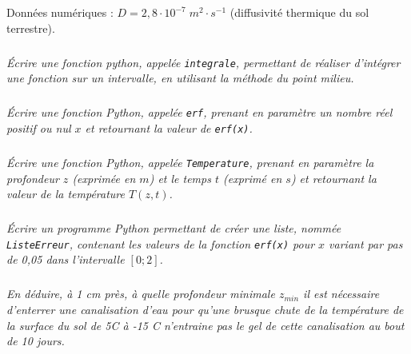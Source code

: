 Données numériques : $D=2,8\cdot 10^{-7} \; m^2\cdot s^{-1}$ (diffusivité thermique du sol terrestre).

\setcounter{subparagraph}{0}

\subparagraph{}
\textit{Écrire une fonction python, appelée \texttt{integrale}, permettant de réaliser d'intégrer une fonction sur un intervalle, en utilisant la méthode du point milieu.}

\subparagraph{}
\textit{Écrire une fonction Python, appelée \texttt{erf}, prenant en paramètre un nombre réel positif ou nul $x$ et retournant la valeur de \texttt{erf(x)}.}

\subparagraph{}
\textit{Écrire une fonction Python, appelée \texttt{Temperature}, prenant en paramètre la profondeur $z$ (exprimée en $m$) et le temps $t$ (exprimé en $s$) et retournant la valeur de la température $T(z, t)$.}

\subparagraph{}
\textit{Écrire un programme Python permettant de créer une liste, nommée \texttt{ListeErreur}, contenant les valeurs de la fonction \texttt{erf(x)} pour $x$ variant par pas de 0,05 dans l’intervalle $[0 ; 2]$.}

\subparagraph{}
\textit{En déduire, à 1 cm près, à quelle profondeur minimale $z_{min}$ il est nécessaire d'enterrer une canalisation d'eau pour qu'une brusque chute de la température de la surface du sol de 5\textdegree C à -15 \textdegree C n'entraine pas le gel de cette canalisation au bout de 10 jours.}
